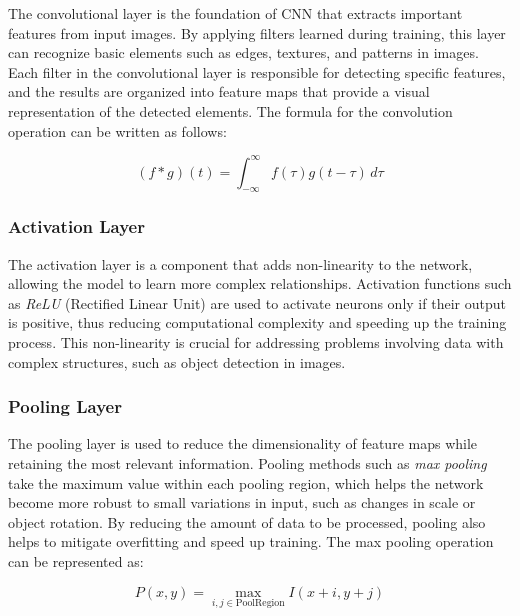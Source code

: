 The convolutional layer is the foundation of CNN that extracts important features from input images. By applying filters learned during training, this layer can recognize basic elements such as edges, textures, and patterns in images. Each filter in the convolutional layer is responsible for detecting specific features, and the results are organized into feature maps that provide a visual representation of the detected elements. The formula for the convolution operation can be written as follows:

\begin{equation}
  (f * g)(t) = \int_{-\infty}^{\infty} f(\tau)g(t - \tau) \, d\tau
\end{equation}

\vspace{5pt}
\subsubsection{Activation Layer}
\label{subsubsec:Activation Layer}

The activation layer is a component that adds non-linearity to the network, allowing the model to learn more complex relationships. Activation functions such as \emph{ReLU} (Rectified Linear Unit) are used to activate neurons only if their output is positive, thus reducing computational complexity and speeding up the training process. This non-linearity is crucial for addressing problems involving data with complex structures, such as object detection in images.

\vspace{5pt}
\subsubsection{Pooling Layer}
\label{subsubsec:Pooling Layer}

The pooling layer is used to reduce the dimensionality of feature maps while retaining the most relevant information. Pooling methods such as \emph{max pooling} take the maximum value within each pooling region, which helps the network become more robust to small variations in input, such as changes in scale or object rotation. By reducing the amount of data to be processed, pooling also helps to mitigate overfitting and speed up training. The max pooling operation can be represented as:

\begin{equation}
  P(x, y) = \max_{i,j \in \mathrm{PoolRegion}} I(x+i, y+j)
\end{equation}

